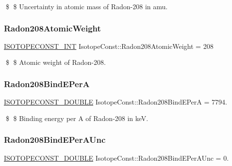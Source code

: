 \$ \$ Uncertainty in atomic mass of Radon-\/208 in amu. \mbox{\label{group___isotope_const-_radon-_rn208_ga64cdb85b1077cda88fa3c2da2f26d624}} 
\subsubsection{\texorpdfstring{Radon208\+Atomic\+Weight}{Radon208AtomicWeight}}
{\footnotesize\ttfamily \mbox{\hyperlink{group___isotope_const-_macros_ga5f18360b3e99483a35c32d789e62621c}{I\+S\+O\+T\+O\+P\+E\+C\+O\+N\+S\+T\+\_\+\+I\+NT}} Isotope\+Const\+::\+Radon208\+Atomic\+Weight = 208}

\$ \$ Atomic weight of Radon-\/208. \mbox{\label{group___isotope_const-_radon-_rn208_ga340023e321760b999f1043ced57821b7}} 
\subsubsection{\texorpdfstring{Radon208\+Bind\+E\+PerA}{Radon208BindEPerA}}
{\footnotesize\ttfamily \mbox{\hyperlink{group___isotope_const-_macros_ga8f45a7272ce02c0b4c65c44636ed719a}{I\+S\+O\+T\+O\+P\+E\+C\+O\+N\+S\+T\+\_\+\+D\+O\+U\+B\+LE}} Isotope\+Const\+::\+Radon208\+Bind\+E\+PerA = 7794.}

\$ \$ Binding energy per A of Radon-\/208 in keV. \mbox{\label{group___isotope_const-_radon-_rn208_ga5f1c64e409a8f5927fa688de1e93c2a3}} 
\subsubsection{\texorpdfstring{Radon208\+Bind\+E\+Per\+A\+Unc}{Radon208BindEPerAUnc}}
{\footnotesize\ttfamily \mbox{\hyperlink{group___isotope_const-_macros_ga8f45a7272ce02c0b4c65c44636ed719a}{I\+S\+O\+T\+O\+P\+E\+C\+O\+N\+S\+T\+\_\+\+D\+O\+U\+B\+LE}} Isotope\+Const\+::\+Radon208\+Bind\+E\+Per\+A\+Unc = 0.}


